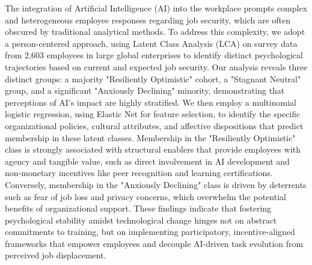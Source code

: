 \documentclass[]{article}
\begin{document}
The integration of Artificial Intelligence (AI) into the workplace prompts complex and heterogeneous employee responses regarding job security, which are often obscured by traditional analytical methods. To address this complexity, we adopt a person-centered approach, using Latent Class Analysis (LCA) on survey data from 2,603 employees in large global enterprises to identify distinct psychological trajectories based on current and expected job security. Our analysis reveals three distinct groups: a majority "Resiliently Optimistic" cohort, a "Stagnant Neutral" group, and a significant "Anxiously Declining" minority, demonstrating that perceptions of AI's impact are highly stratified. We then employ a multinomial logistic regression, using Elastic Net for feature selection, to identify the specific organizational policies, cultural attributes, and affective dispositions that predict membership in these latent classes. Membership in the "Resiliently Optimistic" class is strongly associated with structural enablers that provide employees with agency and tangible value, such as direct involvement in AI development and non-monetary incentives like peer recognition and learning certifications. Conversely, membership in the "Anxiously Declining" class is driven by deterrents such as fear of job loss and privacy concerns, which overwhelm the potential benefits of organizational support. These findings indicate that fostering psychological stability amidst technological change hinges not on abstract commitments to training, but on implementing participatory, incentive-aligned frameworks that empower employees and decouple AI-driven task evolution from perceived job displacement.
\end{document}
